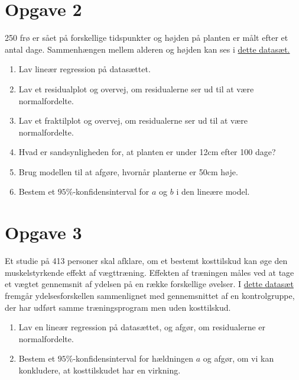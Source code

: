 \section*{Opgave 2}

250 frø er sået på forskellige tidspunkter og højden på planten er målt efter et antal dage. Sammenhængen mellem alderen og højden kan ses i \href{https://github.com/ChristianJLex/TeachingNotes/raw/master/2022-2023/Data%20og%20lign/Plantevaekst.xlsx}{\color{blue!60} dette datasæt.}

\begin{enumerate}[label=\roman*)]
	\item Lav lineær regression på datasættet.
	\item Lav et residualplot og overvej, om residualerne ser ud til at være normalfordelte.
	\item Lav et fraktilplot og overvej, om residualerne ser ud til at være normalfordelte. 
	\item Hvad er sandsynligheden for, at planten er under 12cm efter 100 dage?
	\item Brug modellen til at afgøre, hvornår planterne er 50cm høje.
	\item Bestem et $95\%$-konfidensinterval for $a$ og $b$ i den lineære model. 
\end{enumerate}

\section*{Opgave 3}
Et studie på 413 personer skal afklare, om et bestemt kosttilskud kan øge den muskelstyrkende effekt af vægttræning. Effekten af træningen måles ved at tage et vægtet gennemsnit
af ydelsen på en række forskellige øvelser. I 
\href{https://github.com/ChristianJLex/TeachingNotes/raw/master/2022-2023/Data%20og%20lign/kosttilskud.xlsx}{\color{blue!60}dette datasæt}
 fremgår ydelsesforskellen sammenlignet med gennemsnittet af en kontrolgruppe, der har udført samme træningsprogram men uden kosttilskud. 

\begin{enumerate}[label=\roman*)]
	\item Lav en lineær regression på datasættet, og afgør, om residualerne er normalfordelte. 
	\item Bestem et $95\%$-konfidensinterval for hældningen $a$ og afgør, om vi kan konkludere, at kosttilskudet har en virkning. 
\end{enumerate}
